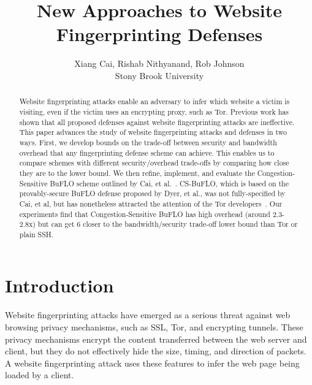 \documentclass[10pt,journal]{IEEEtran}
\newcommand{\buflo} {BuFLO\xspace}
\newcommand{\csbuflo} {Congestion-Sensitive BuFLO\xspace}
\newcommand{\csb} {CS-BuFLO\xspace}
\begin{document}
\title{New Approaches to Website Fingerprinting Defenses}

\author{Xiang Cai, Rishab Nithyanand, Rob Johnson\\Stony Brook University}
\date{}

\maketitle

\begin{abstract}
  Website fingerprinting attacks\cite{hintz-pets02} enable an
  adversary to infer which website a victim is visiting, even if the
  victim uses an encrypting proxy, such as Tor\cite{tor-website}.
  Previous work has shown that all proposed defenses against website
  fingerprinting attacks are ineffective\cite{dyer-snp12,cai-ccs12}.
  This paper advances the study of website fingerprinting attacks and
  defenses in two ways.  First, we develop bounds on the trade-off
  between security and bandwidth overhead that any fingerprinting
  defense scheme can achieve.  This enables us to compare schemes with
  different security/overhead trade-offs by comparing how close they
  are to the lower bound.  We then refine, implement, and evaluate the
  \csbuflo scheme outlined by Cai, et al.~\cite{cai-ccs12}.  \csb,
  which is based on the provably-secure \buflo defense proposed by
  Dyer, et al.\cite{dyer-snp12}, was not fully-specified by Cai, et
  al, but has nonetheless attracted the attention of the Tor
  developers~\cite{perry-critique,perry-tbdesign}.  Our experiments
  find that \csbuflo has high overhead (around 2.3-2.8x) but can get
  6 closer to the bandwidth/security trade-off lower bound
  than Tor or plain SSH.
\end{abstract}



\section{Introduction}
\label{sec:introduction}

Website fingerprinting attacks have emerged as a serious threat
against web browsing privacy mechanisms, such as SSL, Tor, and
encrypting tunnels.  These privacy mechanisms encrypt the content
transferred between the web server and client, but they do not
effectively hide the size, timing, and direction of packets.  A
website fingerprinting attack uses these features to infer the web
page being loaded by a client.
\end{document}
